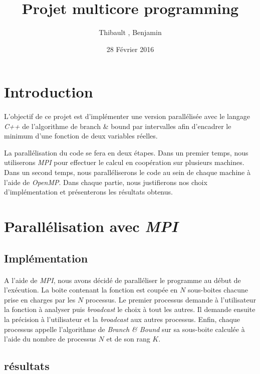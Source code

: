 \documentclass[a4paper]{article}
\title{Projet multicore programming}
\author{Thibault \bsc{Bèziers la Fosse}, Benjamin \bsc{Moreau}}
\date{28 Février 2016}
\begin{document}
\maketitle

\section{Introduction}
    \paragraph{}
    L'objectif de ce projet est d'implémenter une version parallélisée avec le langage \emph{C++} de l'algorithme de branch \& bound par intervalles afin d'encadrer le minimum d'une fonction de deux variables réelles.
    
    La parallélisation du code se fera en deux étapes. Dans un premier temps, nous utiliserons \emph{MPI} pour effectuer le calcul en coopération sur plusieurs machines. Dans un second temps, nous paralléliserons le code au sein de chaque machine à l'aide de \emph{OpenMP}. Dans chaque partie, nous justifierons nos choix d'implémentation et présenterons les résultats obtenus.
    
\section{Parallélisation avec \emph{MPI}}
    \subsection{Implémentation}
    \paragraph{}
    A l'aide de \emph{MPI}, nous avons décidé de paralléliser le programme au début de l’exécution. La boite contenant la fonction est coupée en $N$ sous-boites chacune prise en charges par les $N$ processus.
    Le premier processus demande à l'utilisateur la fonction à analyser puis \emph{broadcast} le choix à tout les autres. Il demande ensuite la précision à l'utilisateur et la \emph{broadcast} aux autres processus.
    Enfin, chaque processus appelle l'algorithme de \emph{Branch \& Bound} sur sa sous-boite calculée à l'aide du nombre de processus $N$ et de son rang $K$. 
    \subsection{résultats}
    \paragraph{}
    
\end{document}
